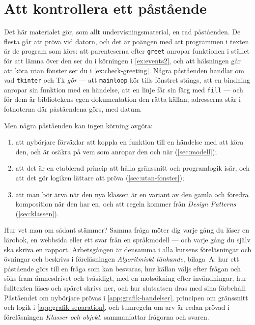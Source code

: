 \chapter{Att kontrollera ett påstående}
\label{app:verifiera-grafik}

Det här materialet gör, som allt undervisningsmaterial, en rad
påståenden.  De flesta går att pröva vid datorn, och det är poängen med
att programmen i texten är de program som körs: att parenteserna efter
\texttt{greet} anropar funktionen i stället för att lämna
över den ser du i körningen i \cref{ex:events2}, och att hälsningen går
att köra utan fönster ser du i \cref{ex:check-greeting}.  Några
påståenden handlar om vad \texttt{tkinter} och Tk
\emph{gör} --- att \texttt{mainloop} kör tills fönstret
stängs, att en bindning anropar sin funktion med en händelse, att en
linje får sin färg med \texttt{fill} --- och för dem är bibliotekens egen
dokumentation den rätta källan; adresserna står i fotnoterna där
påståendena görs, med datum.

Men några påståenden kan ingen körning avgöra:
\begin{enumerate}
  \item att nybörjare förväxlar att koppla en funktion till en händelse
    med att köra den, och är osäkra på vem som anropar den och när
    (\cref{sec:modell});
  \item att det är en etablerad princip att hålla gränssnitt och
    programlogik isär, och att det gör logiken lättare att pröva
    (\cref{sec:utan-fonster});
  \item att man bör ärva när den nya klassen är en variant av den gamla
    och föredra komposition när den har en, och att regeln kommer från
    \emph{Design Patterns} (\cref{sec:klassen}).
\end{enumerate}
Hur vet man om sådant stämmer?  Samma fråga möter dig varje gång du läser
en lärobok, en webbsida eller ett svar från en språkmodell --- och varje
gång du själv ska skriva en rapport.  Arbetsgången är densamma i alla
kursens föreläsningar och övningar och beskrivs i föreläsningen
\emph{Algoritmiskt tänkande}, bilaga~A: hur ett påstående görs till en
fråga som kan besvaras, hur källan väljs efter frågan och söks fram
ämnesdrivet och tvåsidigt, med en motsökning efter invändningar, hur
fulltexten läses och spåret skrivs ner, och hur slutsatsen dras med sina
förbehåll.  Påståendet om nybörjare prövas i
\cref{app:grafik-handelser}, principen om gränssnitt och logik i
\cref{app:grafik-separation}, och tumregeln om arv är redan prövad i
föreläsningen \emph{Klasser och objekt}.  
sammanfattar frågorna och svaren.


